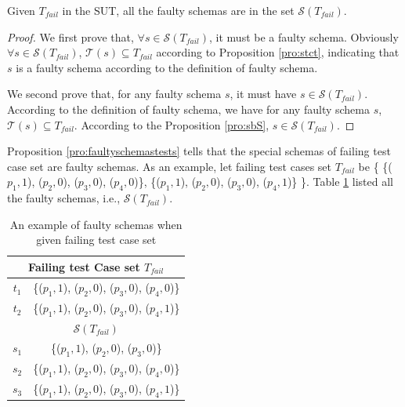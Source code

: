 \begin{proposition}\label{pro:faultyschemastests}
Given  $T_{fail}$ in the SUT, all the faulty schemas are in the set $\mathcal{S}(T_{fail})$.
\end{proposition}

\begin{proof}
We first prove that, $\forall s \in \mathcal{S}(T_{fail})$, it must be a faulty schema.
Obviously $\forall s \in \mathcal{S}(T_{fail})$, $\mathcal{T}(s) \subseteq T_{fail}$ according to Proposition \ref{pro:stct}, indicating that $s$ is a faulty schema according to the definition of faulty schema.

We second prove that, for any faulty schema $s$, it must have $s \in \mathcal{S}(T_{fail})$.
According to the definition of faulty schema, we have for any faulty schema $s$, $\mathcal{T}(s) \subseteq T_{fail}$.
According to the Proposition \ref{pro:sbS}, $s \in \mathcal{S}(T_{fail})$.
\end{proof}

Proposition \ref{pro:faultyschemastests} tells that the special schemas of failing test case set are faulty schemas. As an example, let failing test cases set $T_{fail}$ be \{ \{($p_{1}, 1$), ($p_{2}, 0$), ($p_{3}, 0$), ($p_{4}, 0$)\}, \{($p_{1}, 1$), ($p_{2}, 0$), ($p_{3}, 0$), ($p_{4}, 1$)\} \}. Table \ref{ex:faultyschemaspffailingtestset} listed all the faulty schemas, i.e., $\mathcal{S}(T_{fail})$.


\begin{table}[htbp]
  \centering
  \caption{An example of faulty schemas when given failing test case set}
      \label{ex:faultyschemaspffailingtestset}
    \begin{tabular}{|c|c|} \hline
  \multicolumn{2}{|c|}{\textbf{Failing test Case set $T_{fail}$}} \\ \hline
  $t_{1}$ & \{($p_{1}, 1$), ($p_{2}, 0$), ($p_{3}, 0$), ($p_{4}, 0$)\}\\
  $t_{2}$ & \{($p_{1}, 1$), ($p_{2}, 0$), ($p_{3}, 0$), ($p_{4}, 1$)\}\\ \hline
  \multicolumn{2}{|c|}{\textbf{ $\mathcal{S}(T_{fail})$ }}  \\ \hline
  $s_{1}$ & \{($p_{1}, 1$), ($p_{2}, 0$), ($p_{3}, 0$)\}  \\
  $s_{2}$ & \{($p_{1}, 1$), ($p_{2}, 0$), ($p_{3}, 0$), ($p_{4}, 0$)\} \\
  $s_{3}$ & \{($p_{1}, 1$), ($p_{2}, 0$), ($p_{3}, 0$), ($p_{4}, 1$)\} \\ \hline
    \end{tabular}%
\end{table}%


